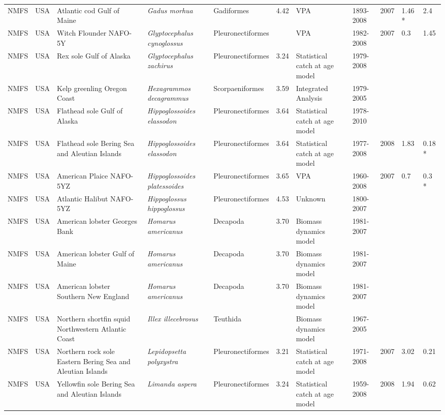 \begin{longtable}{p{1.5cm}p{1.5cm}p{3cm}p{3cm}p{2.5cm}p{0.9cm}p{1.4cm}p{0.9cm}p{0.9cm}p{0.9cm}p{1cm}}
  NMFS & USA & Atlantic cod Gulf of Maine & \textit{Gadus morhua} & Gadiformes & 4.42 & VPA & 1893-2008 & 2007 & 1.46 * & 2.4 \\ 
  NMFS & USA & Witch Flounder NAFO-5Y & \textit{Glyptocephalus cynoglossus} & Pleuronectiformes &  & VPA & 1982-2008 & 2007 & 0.3 & 1.45 \\ 
  NMFS & USA & Rex sole Gulf of Alaska & \textit{Glyptocephalus zachirus} & Pleuronectiformes & 3.24 & Statistical catch at age model & 1979-2008 &  &  &  \\ 
  NMFS & USA & Kelp greenling Oregon Coast & \textit{Hexagrammos decagrammus} & Scorpaeniformes & 3.59 & Integrated Analysis & 1979-2005 &  &  &  \\ 
  NMFS & USA & Flathead sole Gulf of Alaska & \textit{Hippoglossoides elassodon} & Pleuronectiformes & 3.64 & Statistical catch at age model & 1978-2010 &  &  &  \\ 
  NMFS & USA & Flathead sole Bering Sea and Aleutian Islands & \textit{Hippoglossoides elassodon} & Pleuronectiformes & 3.64 & Statistical catch at age model & 1977-2008 & 2008 & 1.83 & 0.18 * \\ 
  NMFS & USA & American Plaice NAFO-5YZ & \textit{Hippoglossoides platessoides} & Pleuronectiformes & 3.65 & VPA & 1960-2008 & 2007 & 0.7 & 0.3 * \\ 
  NMFS & USA & Atlantic Halibut NAFO-5YZ & \textit{Hippoglossus hippoglossus} & Pleuronectiformes & 4.53 & Unknown & 1800-2007 &  &  &  \\ 
  NMFS & USA & American lobster Georges Bank & \textit{Homarus americanus} & Decapoda & 3.70 & Biomass dynamics model & 1981-2007 &  &  &  \\ 
  NMFS & USA & American lobster Gulf of Maine & \textit{Homarus americanus} & Decapoda & 3.70 & Biomass dynamics model & 1981-2007 &  &  &  \\ 
  NMFS & USA & American lobster Southern New England & \textit{Homarus americanus} & Decapoda & 3.70 & Biomass dynamics model & 1981-2007 &  &  &  \\ 
  NMFS & USA & Northern shortfin squid Northwestern Atlantic Coast & \textit{Illex illecebrosus} & Teuthida &  & Biomass dynamics model & 1967-2005 &  &  &  \\ 
  NMFS & USA & Northern rock sole Eastern Bering Sea and Aleutian Islands & \textit{Lepidopsetta polyxystra} & Pleuronectiformes & 3.21 & Statistical catch at age model & 1971-2008 & 2007 & 3.02 & 0.21 \\ 
  NMFS & USA & Yellowfin sole Bering Sea and Aleutian Islands & \textit{Limanda aspera} & Pleuronectiformes & 3.24 & Statistical catch at age model & 1959-2008 & 2008 & 1.94 & 0.62 \\ 

\end{longtable}
